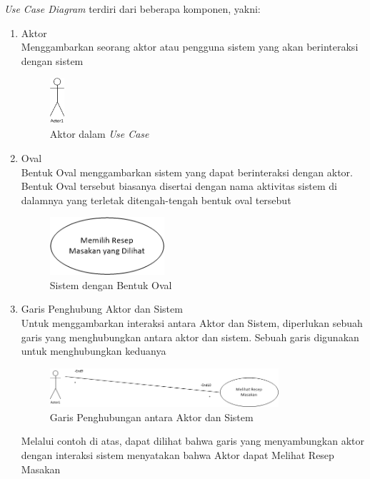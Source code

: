 		\textit{Use Case Diagram} terdiri dari beberapa komponen, yakni:
		\begin{enumerate}
			\item Aktor\\ 
			Menggambarkan seorang aktor atau pengguna sistem yang akan berinteraksi dengan sistem
			\begin{figure}[H]
				\centering
				\includegraphics[width=0.05\textwidth]{gambar/use-case/aktor}
				\caption{Aktor dalam \textit{Use Case}}
			\end{figure}
			\vspace{1cm}
			\item Oval\\ 
			Bentuk Oval menggambarkan sistem yang dapat berinteraksi dengan aktor. Bentuk Oval tersebut biasanya disertai dengan nama aktivitas sistem di dalamnya yang terletak ditengah-tengah bentuk oval tersebut
			\begin{figure}[H]
				\centering
				\includegraphics[width=0.4\textwidth]{gambar/use-case/balon}
				\caption{Sistem dengan Bentuk Oval}
			\end{figure}
		
			\item Garis Penghubung Aktor dan Sistem\\ 
			Untuk menggambarkan interaksi antara Aktor dan Sistem, diperlukan sebuah garis yang menghubungkan antara aktor dan sistem. Sebuah garis digunakan untuk menghubungkan keduanya
			\begin{figure}[H]
				\centering
				\includegraphics[width=0.8\textwidth]{gambar/use-case/penghubung_aktor_sistem}
				\caption{Garis Penghubungan antara Aktor dan Sistem}
			\end{figure}
			Melalui contoh di atas, dapat dilihat bahwa garis yang menyambungkan aktor dengan interaksi sistem menyatakan bahwa Aktor dapat Melihat Resep Masakan
			

\end{enumerate}

